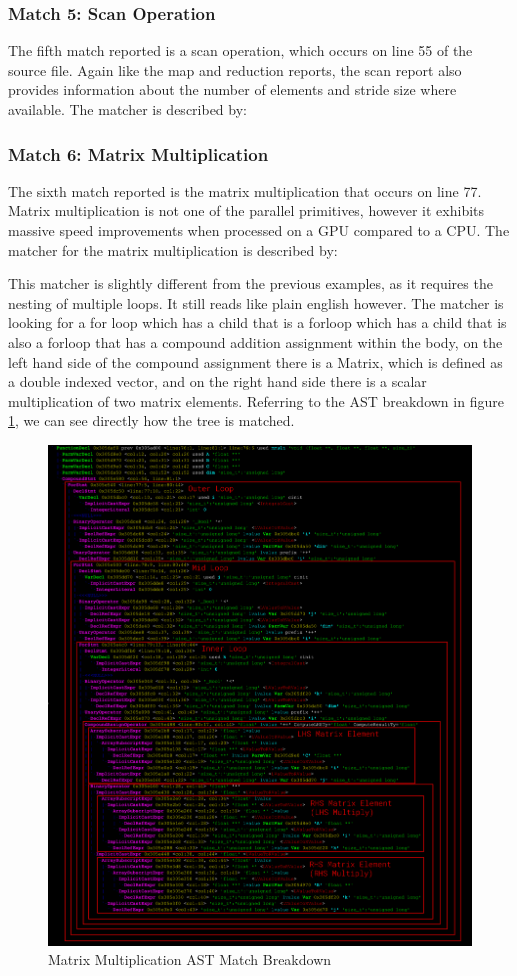 \subsubsection{Match 5: Scan Operation}
The fifth match reported is a scan operation, which occurs on line 55 of the source file. Again like
the map and reduction reports, the scan report also provides information about the number of
elements and stride size where available. The matcher is described by:


\subsubsection{Match 6: Matrix Multiplication}
The sixth match reported is the matrix multiplication that occurs on line 77. Matrix multiplication
is not one of the parallel primitives, however it exhibits massive speed improvements when processed
on a GPU compared to a CPU. The matcher for the matrix multiplication is described by:

This matcher is slightly different from the previous examples, as it requires the nesting of
multiple loops. It still reads like plain english however. The matcher is looking for a for loop
which has a child that is a forloop which has a child that is also a forloop that has a compound
addition assignment within the body, on the left hand side of the compound assignment there is a
Matrix, which is defined as a double indexed vector, and on the right hand side there is a scalar
multiplication of two matrix elements. Referring to the AST breakdown in figure \ref{mmul_ast}, we
can see directly how the tree is matched.
\begin{figure}[H]
\includegraphics[width=\textwidth]{./Pictures/mmult_ast.png}
\caption{Matrix Multiplication AST Match Breakdown}\label{mmul_ast}
\end{figure}
